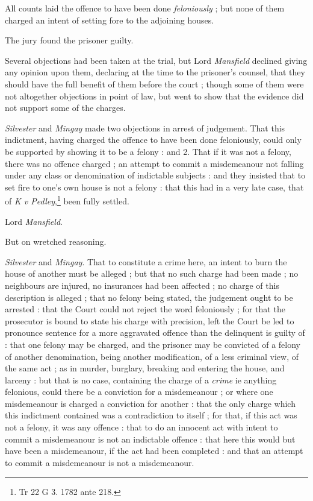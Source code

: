 \documentclass[a4paper]{article}
\begin{document}
All counts laid the offence to have been done \emph{feloniously} ; but none of them charged an intent of setting fore to the adjoining houses.

The jury found the prisoner guilty.

Several objections had been taken at the trial, but Lord \emph{Mansfield} declined giving any opinion upon them, declaring at the time to the prisoner's counsel, that they should have the full benefit of them before the court ; though some of them were not altogether objections  in point of law, but went to show that the evidence did not support some of the charges.

\emph{Silvester} and \emph{Mingay} made two objections in arrest of judgement. That this indictment, having charged the offence to have been done feloniously, could only be supported by showing it to be a felony : and 2. That if it was not a felony, there was no offence charged ; an attempt to commit a misdemeanour not falling under any class or denomination of indictable subjects : and they insisted that to set fire to one's own house is not a felony : that this had in a very late case, that of \emph{K v Pedley},\footnote{Tr 22 G 3. 1782 ante 218.} been fully settled.

\hspace{\parindent} Lord \emph{Mansfield}.

But on wretched reasoning.

\emph{Silvester} and \emph{Mingay}. That to constitute a crime here, an intent to burn the house of another must be alleged ; but that no such charge had been made ; no neighbours are injured, no insurances had been affected ; no charge of this description is alleged ; that no felony being stated, the judgement ought to be arrested : that the Court could not reject the word feloniously ; for that the prosecutor is bound to state his charge with precision, left the Court be led to pronounce sentence for a more aggravated offence than the delinquent is guilty of : that one felony may be charged, and the prisoner may be convicted of a felony of another denomination, being another modification, of a less criminal view, of the same act ; as in murder, burglary, breaking and entering the house, and larceny : but that is no case, containing the charge of a \emph{crime} ie anything felonious, could there be a conviction for a misdemeanour ; or where one misdemeanour is charged a conviction for another : that the only charge which this indictment contained was a contradiction to itself ; for that, if this act was not a felony, it was any offence : that to do an innocent act with intent to commit a misdemeanour is not an indictable offence : that here this would but have been a misdemeanour, if the act had been completed : and that an attempt to commit a misdemeanour is not a misdemeanour.
\end{document}
